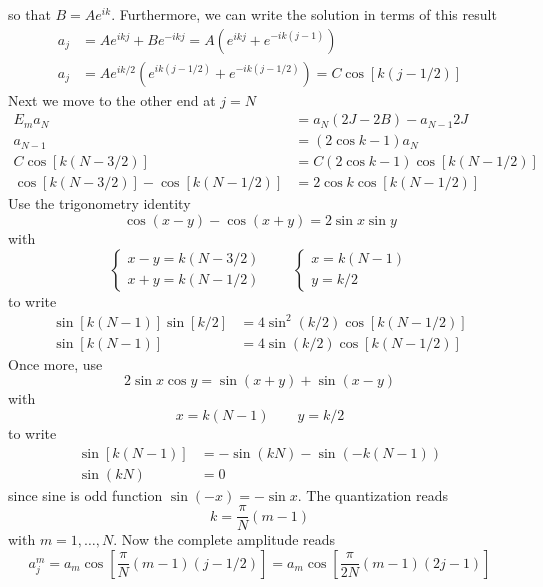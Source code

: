 \documentclass[../../../main.tex]{subfiles}
\begin{document}
so that $B=A e ^{ik}$.
Furthermore, we can write the solution in terms of this result
\begin{align*}
    a_j & = A e ^{ikj }+B e^{-ikj} = A(e ^{ikj }+ e ^{-ik (j-1)})             \\
    a_j & = A e^{ik/2} (e ^{ik(j-1/2)}+ e ^{-ik(j-1/2)}) = C \cos [k (j-1/2)]
\end{align*}
Next we move to the other end at $j=N$
\begin{align*}
    E_m a_N                           & = a_N(2J-2B)-a_{N-1}2J           \\
    a_{N-1}                           & = (2 \cos k -1 )a_N              \\
    C \cos [k(N-3/2)]                 & = C (2 \cos k -1)\cos [k(N-1/2)] \\
    \cos [k(N-3/2)] - \cos [k(N-1/2)] & = 2 \cos k \cos [k(N-1/2)]
\end{align*}
Use the trigonometry identity
\begin{equation*}
    \cos (x-y) - \cos (x+y) = 2 \sin x \sin y
\end{equation*}
with
\begin{equation*}
    \begin{cases}
        x-y = k(N-3/2) \\
        x+y = k(N-1/2)
    \end{cases}
    \qquad
    \begin{cases}
        x=k(N-1) \\
        y=k/2
    \end{cases}
\end{equation*}
to write
\begin{align*}
    \sin [k(N-1)]\sin [k/2] & =  4 \sin ^2 (k/2) \cos [k(N-1/2)] \\
    \sin [k(N-1)]           & =  4 \sin  (k/2) \cos [k(N-1/2)]
\end{align*}
Once more, use
\begin{equation*}
    2 \sin x \cos y = \sin (x+y )  + \sin (x-y)
\end{equation*}
with
\begin{equation*}
    x= k(N-1)\qquad y=k/2
\end{equation*}
to write
\begin{align*}
    \sin [k(N-1)] & =  - \sin (kN) - \sin (-k(N-1)) \\
    \sin (kN)     & = 0
\end{align*}
since sine is odd function $\sin(-x) = -\sin x$.
The quantization reads
\begin{equation*}
    k= \frac{\pi }{N }(m-1)
\end{equation*}
with $m=1,\dots,N$.
Now the complete amplitude reads
\begin{equation*}
    a_j ^m = a_m \cos \left[ \frac{\pi }{N }(m-1 )(j-1/2) \right] = a_m \cos \left[ \frac{\pi }{2 N }(m-1 )(2j-1) \right]
\end{equation*}
\end{document}

